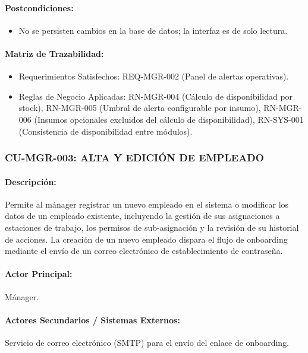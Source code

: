 \paragraph{Postcondiciones:}
\begin{itemize}
    \item No se persisten cambios en la base de datos; la interfaz es de solo lectura.
\end{itemize}

\paragraph{Matriz de Trazabilidad:}
\begin{itemize}
    \item Requerimientos Satisfechos: REQ-MGR-002 (Panel de alertas operativas).
    \item Reglas de Negocio Aplicadas: RN-MGR-004 (Cálculo de disponibilidad por stock), RN-MGR-005 (Umbral de alerta configurable por insumo), RN-MGR-006 (Insumos opcionales excluidos del cálculo de disponibilidad), RN-SYS-001 (Consistencia de disponibilidad entre módulos).
\end{itemize}

\subsubsection{CU-MGR-003: ALTA Y EDICIÓN DE EMPLEADO}
\paragraph{Descripción:} Permite al mánager registrar un nuevo empleado en el sistema o modificar los datos de un empleado existente, incluyendo la gestión de sus asignaciones a estaciones de trabajo, los permisos de sub-asignación y la revisión de su historial de acciones. La creación de un nuevo empleado dispara el flujo de onboarding mediante el envío de un correo electrónico de establecimiento de contraseña.

\paragraph{Actor Principal:} Mánager.

\paragraph{Actores Secundarios / Sistemas Externos:} Servicio de correo electrónico (SMTP) para el envío del enlace de onboarding.


